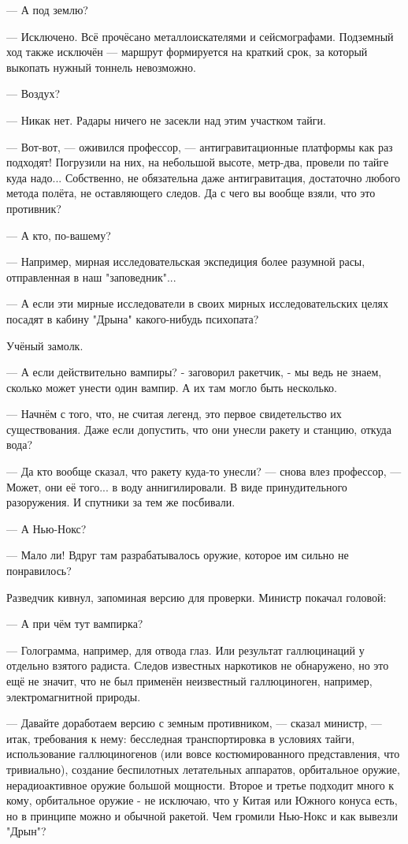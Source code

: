--- А под землю?

--- Исключено. Всё прочёсано металлоискателями и сейсмографами. Подземный ход также исключён ---
маршрут формируется на краткий срок, за который выкопать нужный тоннель невозможно.

--- Воздух?

--- Никак нет. Радары ничего не засекли над этим участком тайги.

--- Вот-вот, --- оживился профессор, --- антигравитационные платформы как раз подходят!
Погрузили на них, на небольшой высоте, метр-два, провели по тайге куда надо...
Собственно, не обязательна даже антигравитация, достаточно любого метода полёта, не оставляющего следов.
Да с чего вы вообще взяли, что это противник?

--- А кто, по-вашему?

--- Например, мирная исследовательская экспедиция более разумной расы, отправленная в наш "заповедник"...

--- А если эти мирные исследователи в своих мирных исследовательских целях посадят в кабину "Дрына" какого-нибудь психопата?

Учёный замолк.

--- А если действительно вампиры? - заговорил ракетчик, - мы ведь не знаем, сколько может унести один вампир.
А их там могло быть несколько.

--- Начнём с того, что, не считая легенд, это первое свидетельство их существования.
Даже если допустить, что они унесли ракету и станцию, откуда вода?

--- Да кто вообще сказал, что ракету куда-то унесли? --- снова влез профессор, --- Может, они её того...
в воду аннигилировали. В виде принудительного разоружения. И спутники за тем же посбивали.

--- А Нью-Нокс?

--- Мало ли! Вдруг там разрабатывалось оружие, которое им сильно не понравилось?

Разведчик кивнул, запоминая версию для проверки. Министр покачал головой:

--- А при чём тут вампирка?

--- Голограмма, например, для отвода глаз. Или результат галлюцинаций у отдельно взятого радиста.
Следов известных наркотиков не обнаружено, но это ещё не значит, что не был применён неизвестный галлюциноген,
например, электромагнитной природы.

--- Давайте доработаем версию с земным противником, --- сказал министр, --- итак, требования к нему:
бесследная транспортировка в условиях тайги, использование галлюциногенов (или вовсе костюмированного представления,
что тривиально), создание беспилотных летательных аппаратов, орбитальное оружие, нерадиоактивное оружие большой мощности.
Второе и третье подходит много к кому, орбитальное оружие - не исключаю, что у Китая или Южного конуса есть,
но в принципе можно и обычной ракетой. Чем громили Нью-Нокс и как вывезли "Дрын"?

